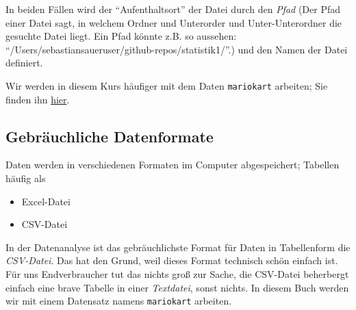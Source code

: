 \documentclass[
  letterpaper,
  oneside,
  open=any]{scrbook}
\providecommand{\tightlist}{%
  \setlength{\itemsep}{0pt}\setlength{\parskip}{0pt}}\usepackage{longtable,booktabs,array}
\theoremstyle{definition}
\theoremstyle{definition}
\theoremstyle{definition}
\theoremstyle{remark}
\begin{document}
In beiden Fällen wird der \enquote{Aufenthaltsort} der Datei durch den
\emph{Pfad} (Der Pfad einer Datei sagt, in welchem Ordner und Unterorder
und Unter-Unterordner die gesuchte Datei liegt. Ein Pfad könnte z.B. so
aussehen: \enquote{/Users/sebastiansaueruser/github-repos/statistik1/}.)
und den Namen der Datei definiert.

\begin{tcolorbox}[enhanced jigsaw, bottomrule=.15mm, left=2mm, colbacktitle=quarto-callout-note-color!10!white, bottomtitle=1mm, colframe=quarto-callout-note-color-frame, coltitle=black, rightrule=.15mm, breakable, toptitle=1mm, titlerule=0mm, title=\textcolor{quarto-callout-note-color}{\faInfo}\hspace{0.5em}{Hinweis}, opacitybacktitle=0.6, arc=.35mm, colback=white, leftrule=.75mm, opacityback=0, toprule=.15mm]

Wir werden in diesem Kurs häufiger mit dem Daten \texttt{mariokart}
arbeiten; Sie finden ihn
\href{https://vincentarelbundock.github.io/Rdatasets/csv/openintro/mariokart.csv}{hier}.\footnotemark{}

\end{tcolorbox}


\subsection{Gebräuchliche
Datenformate}\label{gebruxe4uchliche-datenformate}

Daten werden in verschiedenen Formaten im Computer abgespeichert;
Tabellen häufig als

\begin{itemize}
\tightlist
\item
  Excel-Datei
\item
  CSV-Datei
\end{itemize}

In der Datenanalyse ist das gebräuchlichste Format für Daten in
Tabellenform die \emph{CSV-Datei}. Das hat den Grund, weil dieses Format
technisch schön einfach ist. Für uns Endverbraucher tut das nichts groß
zur Sache, die CSV-Datei beherbergt einfach eine brave Tabelle in einer
\emph{Textdatei}, sonst nichts. In diesem Buch werden wir mit einem
Datensatz namens \texttt{mariokart} arbeiten.
\end{document}
